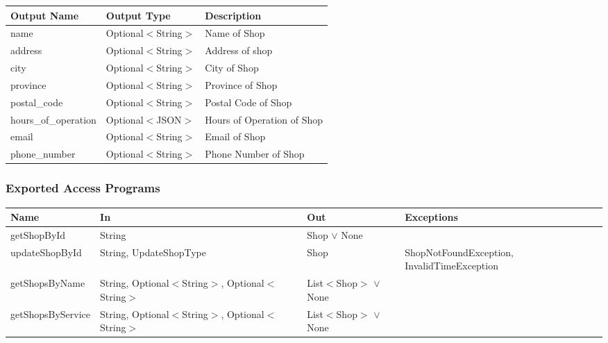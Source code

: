 \documentclass[12pt, titlepage]{article}
\begin{document}
\begin{table}[H]
	\begin{tabular}{|p{}|p{}|p{}|}
		\hline
		\textbf{Output Name} & \textbf{Output Type} & \textbf{Description}       \\
		\hline
		name                 & Optional$<$String$>$ & Name of Shop               \\
		\hline
		address              & Optional$<$String$>$ & Address of shop            \\
		\hline
		city                 & Optional$<$String$>$ & City of Shop               \\
		\hline
		province             & Optional$<$String$>$ & Province of Shop           \\
		\hline
		postal\_code         & Optional$<$String$>$ & Postal Code of Shop        \\
		\hline
		hours\_of\_operation & Optional$<$JSON$>$   & Hours of Operation of Shop \\
		\hline
		email                & Optional$<$String$>$ & Email of Shop              \\
		\hline
		phone\_number        & Optional$<$String$>$ & Phone Number of Shop       \\
		\hline
	\end{tabular}
\end{table}

\subsubsection{Exported Access Programs}

\begin{center}
	\begin{adjustbox}{width=\textwidth}
		\begin{tabular}{llll}
			\hline
			\textbf{Name}     & \textbf{In}                                        & \textbf{Out}               & \textbf{Exceptions}                         \\
			\hline
			getShopById       & String                                             & Shop $\lor$ None           & ~                                           \\
			updateShopById    & String, UpdateShopType                             & Shop                       & ShopNotFoundException, InvalidTimeException \\
			getShopsByName    & String, Optional$<$String$>$, Optional$<$String$>$ & List$<$Shop$>$ $\lor$ None & ~                                           \\
			getShopsByService & String, Optional$<$String$>$, Optional$<$String$>$ & List$<$Shop$>$ $\lor$ None & ~                                           \\
			\hline
		\end{tabular}
	\end{adjustbox}
\end{center}
\end{document}
